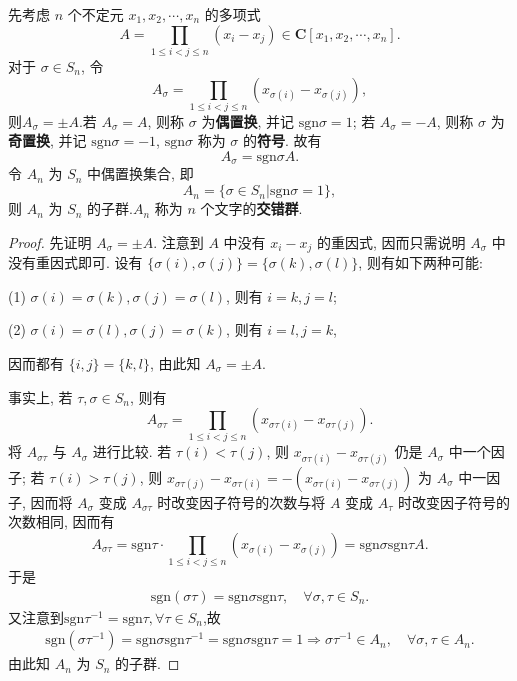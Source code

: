 \documentclass[../../main.tex]{subfiles}
\begin{document}
\begin{example}
先考虑 \( n \) 个不定元 \( x_1, x_2, \cdots, x_n \) 的多项式
\[
A = \prod_{1 \leqslant i < j \leqslant n} (x_i - x_j) \in \mathbf{C}[x_1, x_2, \cdots, x_n].
\]
对于 \( \sigma \in S_n \), 令
\[
A_\sigma = \prod_{1 \leqslant i < j \leqslant n} (x_{\sigma(i)} - x_{\sigma(j)}),
\]
则$A_{\sigma}=\pm A$.若 \( A_\sigma = A \), 则称 \( \sigma \) 为\textbf{偶置换}, 并记 \( \text{sgn}\sigma = 1 \); 若 \( A_\sigma = -A \), 则称 \( \sigma \) 为\textbf{奇置换}, 并记 \( \text{sgn}\sigma = -1 \), \( \text{sgn}\sigma \) 称为 \( \sigma \) 的\textbf{符号}. 故有
\[
A_\sigma = \text{sgn}\sigma A.
\]
令 \( A_n \) 为 \( S_n \) 中偶置换集合, 即
\[
A_n = \{\sigma \in S_n|\text{sgn}\sigma = 1\},
\]
则 \( A_n \) 为 \( S_n \) 的子群.\( A_n \) 称为 \( n \) 个文字的\textbf{交错群}.
\end{example}
\begin{proof}
先证明 \( A_\sigma = \pm A \). 注意到 \( A \) 中没有 \( x_i - x_j \) 的重因式, 因而只需说明 \( A_\sigma \) 中没有重因式即可. 设有 \( \{\sigma(i), \sigma(j)\} = \{\sigma(k), \sigma(l)\} \), 则有如下两种可能:

(1) \( \sigma(i) = \sigma(k), \sigma(j) = \sigma(l) \), 则有 \( i = k, j = l \);

(2) \( \sigma(i) = \sigma(l), \sigma(j) = \sigma(k) \), 则有 \( i = l, j = k \),

因而都有 \( \{i, j\} = \{k, l\} \), 由此知 \( A_\sigma = \pm A \).

事实上, 若 \( \tau, \sigma \in S_n \), 则有
\[
A_{\sigma\tau} = \prod_{1 \leqslant i < j \leqslant n} (x_{\sigma\tau(i)} - x_{\sigma\tau(j)}).
\]
将 \( A_{\sigma\tau} \) 与 \( A_\sigma \) 进行比较. 若 \( \tau(i) < \tau(j) \), 则 \( x_{\sigma\tau(i)} - x_{\sigma\tau(j)} \) 仍是 \( A_\sigma \) 中一个因子; 若 \( \tau(i) > \tau(j) \), 则 \( x_{\sigma\tau(j)} - x_{\sigma\tau(i)} = -(x_{\sigma\tau(i)} - x_{\sigma\tau(j)}) \) 为 \( A_\sigma \) 中一因子, 因而将 \( A_\sigma \) 变成 \( A_{\sigma\tau} \) 时改变因子符号的次数与将 \( A \) 变成 \( A_\tau \) 时改变因子符号的次数相同, 因而有
\[
A_{\sigma\tau} = \text{sgn}\tau \cdot \prod_{1 \leqslant i < j \leqslant n} (x_{\sigma(i)} - x_{\sigma(j)}) = \text{sgn}\sigma\text{sgn}\tau A.
\]
于是
\begin{align*}
\text{sgn}(\sigma\tau) = \text{sgn}\sigma\text{sgn}\tau, \quad \forall \sigma, \tau \in S_n.
\end{align*}
又注意到$\text{sgn}\tau^{-1}=\text{sgn}\tau,  \forall \tau \in S_n$,故
\begin{align*}
\text{sgn}(\sigma\tau^{-1}) = \text{sgn}\sigma\text{sgn}\tau^{-1}=\text{sgn}\sigma\text{sgn}\tau=1\Longrightarrow \sigma\tau^{-1}\in A_n, \quad \forall \sigma, \tau \in A_n.
\end{align*}
由此知 \( A_n \) 为 \( S_n \) 的子群.

\end{proof}
\end{document}
